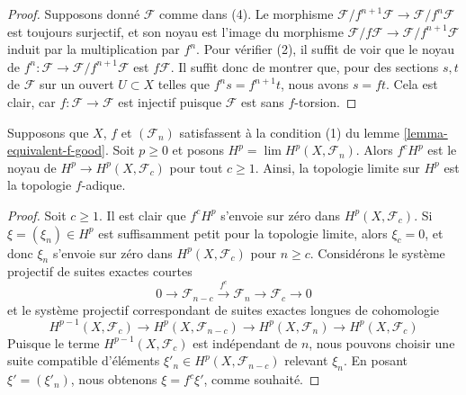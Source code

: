 {\begin{proof}
\medskip\noindent
Supposons donné $\mathcal{F}$ comme dans (4). Le morphisme
$\mathcal{F}/f^{n + 1}\mathcal{F} \to \mathcal{F}/f^n\mathcal{F}$
est toujours surjectif, et son noyau est l'image du morphisme
$\mathcal{F}/f\mathcal{F} \to \mathcal{F}/f^{n + 1}\mathcal{F}$
induit par la multiplication par $f^n$. Pour vérifier (2), il suffit de voir que le noyau de
$f^n : \mathcal{F} \to \mathcal{F}/f^{n + 1}\mathcal{F}$
est $f\mathcal{F}$. Il suffit donc de montrer que, pour des sections
$s, t$ de $\mathcal{F}$ sur un ouvert $U \subset X$
telles que $f^ns = f^{n + 1}t$, nous avons $s = ft$. Cela est clair, car
$f : \mathcal{F} \to \mathcal{F}$ est injectif puisque $\mathcal{F}$
est sans $f$-torsion.
\end{proof}

\begin{lemma}

\label{lemma-topology-I-adic-f}
Supposons que $X$, $f$ et $(\mathcal{F}_n)$ satisfassent à la condition (1) du lemme \ref{lemma-equivalent-f-good}. Soit $p \geq 0$ et posons
$H^p = \lim H^p(X, \mathcal{F}_n)$. Alors $f^cH^p$ est le noyau de $H^p \to H^p(X, \mathcal{F}_c)$ pour tout
$c \geq 1$. Ainsi, la topologie limite sur $H^p$ est la topologie $f$-adique.
\end{lemma}

\begin{proof}

Soit $c \geq 1$. Il est clair que $f^c H^p$ s'envoie sur zéro dans
$H^p(X, \mathcal{F}_c)$. Si $\xi = (\xi_n) \in H^p$ est suffisamment petit pour la topologie limite, alors $\xi_c = 0$, et donc $\xi_n$
s'envoie sur zéro dans $H^p(X, \mathcal{F}_c)$ pour $n \geq c$. Considérons le système projectif de suites exactes courtes
$$
0 \to \mathcal{F}_{n - c} \xrightarrow{f^c} \mathcal{F}_n \to
\mathcal{F}_c \to 0
$$
et le système projectif correspondant de suites exactes longues de cohomologie
$$
H^{p - 1}(X, \mathcal{F}_c) \to
H^p(X, \mathcal{F}_{n - c}) \to
H^p(X, \mathcal{F}_n) \to
H^p(X, \mathcal{F}_c)
$$
Puisque le terme $H^{p - 1}(X, \mathcal{F}_c)$ est indépendant de
$n$, nous pouvons choisir une suite compatible d'éléments
$\xi'_n \in H^p(X, \mathcal{F}_{n - c})$
relevant $\xi_n$. En posant $\xi' = (\xi'_n)$, nous obtenons $\xi = f^c \xi'$,
comme souhaité.

\end{proof}

\begin{lemma}

\label{lemma-limit-finite}


\end{lemma}}
